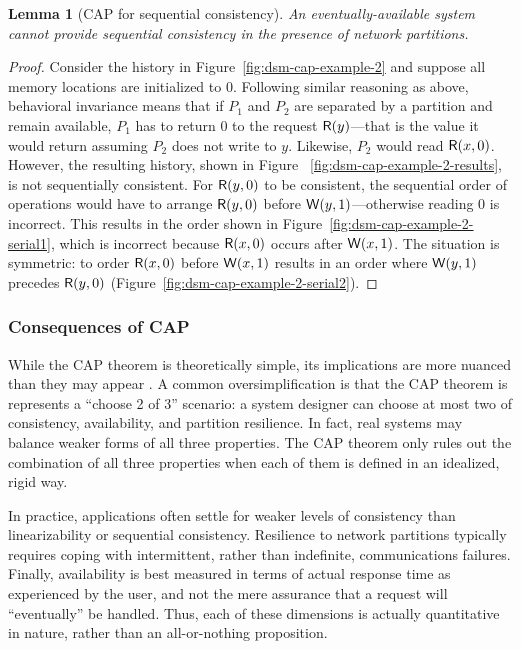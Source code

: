 \documentclass[]             %
{NASA}                       %
\newtheorem{lemma}[theorem]{Lemma}
\theoremstyle{definition}
\begin{document}
\begin{lemma}[CAP for sequential consistency]
  \label{thm:cap-sequential}
  An eventually-available system cannot provide sequential consistency
  in the presence of network partitions.
\end{lemma}
\begin{proof}
  Consider the history in Figure~\ref{fig:dsm-cap-example-2} and
  suppose all memory locations are initialized to $0$. Following
  similar reasoning as above, behavioral invariance means that if
  $P_1$ and $P_2$ are separated by a partition and remain available,
  $P_1$ has to return $0$ to the request $\mathsf{R}\!\left(y\right)$---that is the
  value it would return assuming $P_2$ does not write to
  $y$. Likewise, $P_2$ would read $\mathsf{R}\!\left(x, 0\right)$. However, the
  resulting history, shown in Figure
 ~\ref{fig:dsm-cap-example-2-results}, is not sequentially
  consistent. For $\mathsf{R}\!\left(y, 0\right)$ to be consistent, the sequential
  order of operations would have to arrange $\mathsf{R}\!\left(y, 0\right)$ before
  $\mathsf{W}\!\left(y, 1\right)$---otherwise reading $0$ is incorrect. This results
  in the order shown in Figure~\ref{fig:dsm-cap-example-2-serial1},
  which is incorrect because $\mathsf{R}\!\left(x, 0\right)$ occurs after
  $\mathsf{W}\!\left(x, 1\right)$. The situation is symmetric: to order
  $\mathsf{R}\!\left(x, 0\right)$ before $\mathsf{W}\!\left(x, 1\right)$ results in an order where
  $\mathsf{W}\!\left(y, 1\right)$ precedes $\mathsf{R}\!\left(y, 0\right)$ (Figure~\ref{fig:dsm-cap-example-2-serial2}).
\end{proof}

\subsubsection{Consequences of CAP}
\label{interpretation-of-the-cap-theorem}
While the CAP theorem is theoretically simple, its implications are
more nuanced than they may appear \cite{2012CAP12Years}. A common
oversimplification is that the CAP theorem is represents a ``choose 2
of 3'' scenario: a system designer can choose at most two of
consistency, availability, and partition resilience. In fact, real
systems may balance weaker forms of all three properties. The CAP
theorem only rules out the combination of all three properties when
each of them is defined in an idealized, rigid way.

In practice, applications often settle for weaker levels of
consistency than linearizability or sequential consistency. Resilience
to network partitions typically requires coping with intermittent,
rather than indefinite, communications failures. Finally, availability
is best measured in terms of actual response time as experienced by
the user, and not the mere assurance that a request will
``eventually'' be handled. Thus, each of these dimensions is actually
quantitative in nature, rather than an all-or-nothing proposition.
\end{document}
